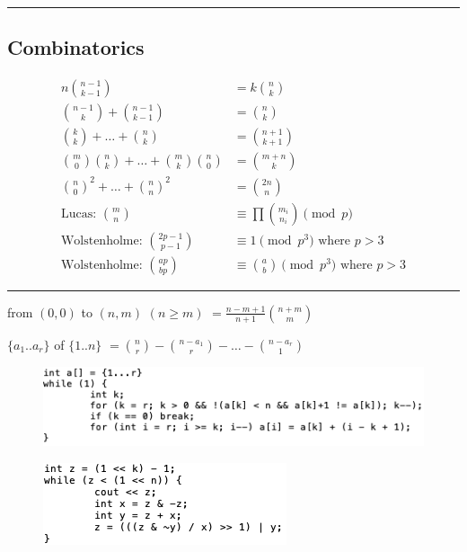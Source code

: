 \documentclass[10pt,letterpaper,landscape]{article}
\begin{document}
\begin{multicols}{2}
\noindent\rule{\linewidth}{1pt}

\subsection{Combinatorics}

\begin{align*}
	n \binom{n-1}{k-1} &= k \binom{n}{k} \\
	\binom{n-1}{k} + \binom{n-1}{k-1} &= \binom{n}{k} \\
	\binom{k}{k} + \hdots + \binom{n}{k} &= \binom{n+1}{k+1} \\
	\binom{m}{0} \binom{n}{k} + \hdots + \binom{m}{k} \binom{n}{0} &= \binom{m+n}{k} \\
	\binom{n}{0}^2 + \hdots + \binom{n}{n}^2 &= \binom{2n}{n} \\
	\text{Lucas: } \binom{m}{n} &\equiv \prod{\binom{m_i}{n_i}} \pmod{p} \\
	\text{Wolstenholme: } \binom{2p-1}{p-1} &\equiv 1 \pmod{p^3} \text{ where } p > 3 \\
	\text{Wolstenholme: } \binom{ap}{bp} &\equiv \binom{a}{b} \pmod{p^3} \text{ where } p > 3
\end{align*}

\noindent\rule{\linewidth}{1pt}

 from $(0,0)$ to $(n,m)$ $(n \ge m)$ $= \frac{n-m+1}{n+1} \binom{n+m}{m}$

 $\{a_1 .. a_r\}$ of $\{1 .. n\}$ $= \binom{n}{r} - \binom{n-a_1}{r} - \hdots - \binom{n-a_r}{1}$

\begin{figure}[h] \includegraphics[scale=0.5]{a.png} \end{figure}

\begin{figure}[h] \includegraphics[scale=0.5]{b.png} \end{figure}


\end{multicols}
\end{document}

